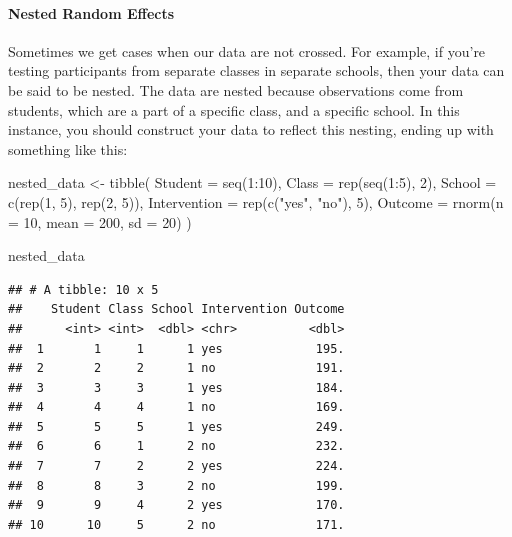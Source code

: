 \documentclass[
]{book}
\newenvironment{Shaded}{\begin{snugshade}}{\end{snugshade}}
\newcommand{\AttributeTok}[1]{\textcolor[rgb]{0.77,0.63,0.00}{#1}}
\newcommand{\DecValTok}[1]{\textcolor[rgb]{0.00,0.00,0.81}{#1}}
\newcommand{\FunctionTok}[1]{\textcolor[rgb]{0.00,0.00,0.00}{#1}}
\newcommand{\NormalTok}[1]{#1}
\newcommand{\OtherTok}[1]{\textcolor[rgb]{0.56,0.35,0.01}{#1}}
\newcommand{\SpecialCharTok}[1]{\textcolor[rgb]{0.00,0.00,0.00}{#1}}
\newcommand{\StringTok}[1]{\textcolor[rgb]{0.31,0.60,0.02}{#1}}
\begin{document}
\hypertarget{nested-random-effects}{%
\paragraph{Nested Random Effects}\label{nested-random-effects}}

Sometimes we get cases when our data are not crossed. For example, if you're testing participants from separate classes in separate schools, then your data can be said to be nested. The data are nested because observations come from students, which are a part of a specific class, and a specific school. In this instance, you should construct your data to reflect this nesting, ending up with something like this:

\begin{Shaded}
\begin{Highlighting}[]
\NormalTok{nested\_data }\OtherTok{\textless{}{-}} \FunctionTok{tibble}\NormalTok{(}
  \AttributeTok{Student =} \FunctionTok{seq}\NormalTok{(}\DecValTok{1}\SpecialCharTok{:}\DecValTok{10}\NormalTok{),}
  \AttributeTok{Class =} \FunctionTok{rep}\NormalTok{(}\FunctionTok{seq}\NormalTok{(}\DecValTok{1}\SpecialCharTok{:}\DecValTok{5}\NormalTok{), }\DecValTok{2}\NormalTok{),}
  \AttributeTok{School =} \FunctionTok{c}\NormalTok{(}\FunctionTok{rep}\NormalTok{(}\DecValTok{1}\NormalTok{, }\DecValTok{5}\NormalTok{), }\FunctionTok{rep}\NormalTok{(}\DecValTok{2}\NormalTok{, }\DecValTok{5}\NormalTok{)),}
  \AttributeTok{Intervention =} \FunctionTok{rep}\NormalTok{(}\FunctionTok{c}\NormalTok{(}\StringTok{"yes"}\NormalTok{, }\StringTok{"no"}\NormalTok{), }\DecValTok{5}\NormalTok{),}
  \AttributeTok{Outcome =} \FunctionTok{rnorm}\NormalTok{(}\AttributeTok{n =} \DecValTok{10}\NormalTok{, }\AttributeTok{mean =} \DecValTok{200}\NormalTok{, }\AttributeTok{sd =} \DecValTok{20}\NormalTok{)}
\NormalTok{)}

\NormalTok{nested\_data}
\end{Highlighting}
\end{Shaded}

\begin{verbatim}
## # A tibble: 10 x 5
##    Student Class School Intervention Outcome
##      <int> <int>  <dbl> <chr>          <dbl>
##  1       1     1      1 yes             195.
##  2       2     2      1 no              191.
##  3       3     3      1 yes             184.
##  4       4     4      1 no              169.
##  5       5     5      1 yes             249.
##  6       6     1      2 no              232.
##  7       7     2      2 yes             224.
##  8       8     3      2 no              199.
##  9       9     4      2 yes             170.
## 10      10     5      2 no              171.
\end{verbatim}
\end{document}
